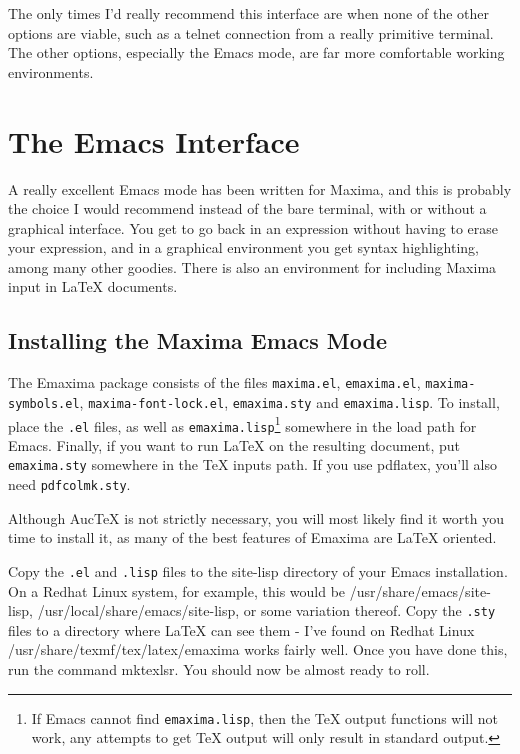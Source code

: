 The only times I'd really recommend this interface are when none of
the other options are viable, such as a telnet connection from a really
primitive terminal.  The other options, especially
the Emacs mode, are far more comfortable working environments. 

\section{The Emacs Interface}

A really excellent Emacs mode has been written for Maxima, and this is probably the
choice I would recommend instead of the bare terminal, with or without
a graphical interface. You get to
go back in an expression without having to erase your expression,
and in a graphical environment you get syntax highlighting, among many other
goodies.  There is also an environment for including Maxima input in LaTeX
documents.

\subsection{Installing the Maxima Emacs Mode}

\noindent
The Emaxima package consists of the files \texttt{maxima.el},
\texttt{emaxima.el}, \texttt{maxima-symbols.el},
\texttt{maxima-font-lock.el}, \texttt{emaxima.sty} and \texttt{emaxima.lisp}.
To install, place the \texttt{.el} files, as well as
\texttt{emaxima.lisp}\footnote{If Emacs cannot find
  \texttt{emaxima.lisp}, then the \TeX{} output functions will not
  work, any attempts to get \TeX{} output will only result in standard
  output.} 
somewhere in the load path for Emacs.
Finally, if you want to run \LaTeX{} on the resulting document, put
\texttt{emaxima.sty} somewhere in the \TeX{} inputs path.  If you use
pdflatex, you'll also need \texttt{pdfcolmk.sty}.

Although AucTeX is not strictly necessary, you will most likely find it worth
you time to install it, as many of the best features of Emaxima are LaTeX
oriented.  

Copy the \texttt{.el} and \texttt{.lisp} files to the site-lisp directory of your Emacs installation.
On a Redhat Linux system, for example, this would be /usr/share/emacs/site-lisp,
/usr/local/share/emacs/site-lisp, or some variation thereof.  Copy the \texttt{.sty}
files to a directory where LaTeX can see them - I've found on Redhat Linux
/usr/share/texmf/tex/latex/emaxima works fairly well.  Once you have done this,
run the command mktexlsr.  You should now be almost ready to roll.

